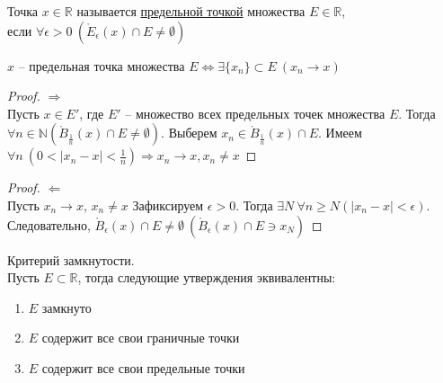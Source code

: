 \begin{definition}
    Точка $x \in \mathds{R}$ называется \underline{предельной точкой} множества $E \in \mathds{R}$,\\
    если $\forall \epsilon > 0 \ (\mathring{E}_\epsilon(x) \cap E \neq \emptyset)$
\end{definition}

\begin{lemma}
    $x$ -- предельная точка множества $E \iff \exists \{x_{n}\} \subset E \ (x_n \to x)$
\end{lemma}

\begin{proof} $\Rightarrow$ \\
    Пусть $x \in E'$, где $E'$ -- множество всех предельных точек множества $E$.
    Тогда $\forall n \in \mathds{N} (\mathring{B}_{\frac{1}{n}}(x) \cap E \neq \emptyset)$.
    Выберем $x_n \in \mathring{B}_{\frac{1}{n}}(x) \cap E$.
    Имеем $\forall n \ (0 < |x_n - x| < \frac{1}{n}) \Rightarrow x_n \to x, x_n \neq x$
\end{proof}

\begin{proof} $\Leftarrow$ \\
    Пусть $x_{n} \to x$, $x_{n} \neq x$ Зафиксируем $\epsilon > 0$. Тогда $\exists N \ \forall n \geq N (|x_{n} - x| < \epsilon)$. Следовательно, $\mathring{B}_{\epsilon}(x) \cap E \neq \emptyset \ (\mathring{B}_{\epsilon}(x) \cap E \ni x_{N})$
\end{proof}

\begin{theorem} Критерий замкнутости.\\
    Пусть $E \subset \mathds{R}$, тогда следующие утверждения эквивалентны:
    \begin{enumerate}
        \item $E$ замкнуто
        \item $E$ содержит все свои граничные точки
        \item $E$ содержит все свои предельные точки
    \end{enumerate}
\end{theorem}

